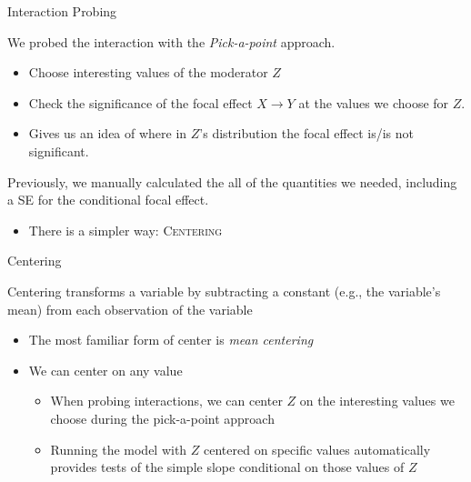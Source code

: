 \documentclass{beamer}
\newcommand{\va}[0]{\vspace{12pt}}
\newcommand{\vb}[0]{\vspace{6pt}}
\begin{document}
\begin{frame}{Interaction Probing}
  
  We probed the interaction with the \emph{Pick-a-point} approach.
  \va
  \begin{itemize}
    \item Choose interesting values of the moderator $Z$
      \vb
    \item Check the significance of the focal effect $X \rightarrow Y$
      at the values we choose for $Z$.
      \vb
    \item Gives us an idea of where in $Z$'s distribution the focal
      effect is/is not significant.
  \end{itemize}
  \va
  Previously, we manually calculated the all of the quantities we
  needed, including a SE for the conditional focal effect.
  \vb
  \begin{itemize}
    \item There is a simpler way: \textsc{Centering}
  \end{itemize}
  
\end{frame}



\begin{frame}{Centering}
  
  Centering transforms a variable by subtracting a constant (e.g., the
  variable's mean) from each observation of the variable
  \va
  \begin{itemize}
  \item The most familiar form of center is \emph{mean centering}
    \vb
  \item We can center on any value
    \vb
    \begin{itemize}
    \item When probing interactions, we can center $Z$ on the
      interesting values we choose during the pick-a-point approach
      \vb
    \item Running the model with $Z$ centered on specific values
      automatically provides tests of the simple slope conditional
      on those values of $Z$
    \end{itemize}
  \end{itemize}
  
\end{frame}
\end{document}
